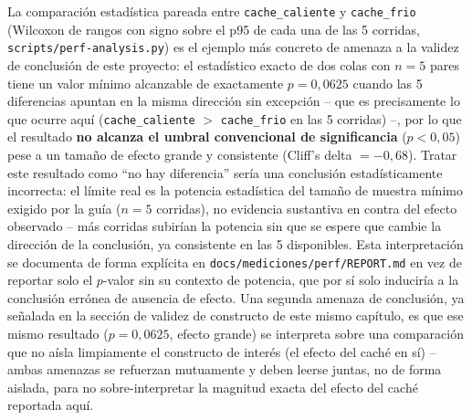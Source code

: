 La comparación estadística pareada entre \texttt{cache\_caliente} y
\texttt{cache\_frio} (Wilcoxon de rangos con signo sobre el p95 de cada
una de las 5 corridas, \texttt{scripts/perf-analysis.py}) es el ejemplo
más concreto de amenaza a la validez de conclusión de este proyecto: el
estadístico exacto de dos colas con $n=5$ pares tiene un valor mínimo
alcanzable de exactamente $p=0{,}0625$ cuando las 5 diferencias apuntan
en la misma dirección sin excepción -- que es precisamente lo que
ocurre aquí (\texttt{cache\_caliente} $>$ \texttt{cache\_frio} en las 5
corridas) --, por lo que el resultado \textbf{no alcanza el umbral
convencional de significancia} ($p<0{,}05$) pese a un tamaño de efecto
grande y consistente (Cliff's delta $=-0{,}68$). Tratar este resultado
como ``no hay diferencia'' sería una conclusión estadísticamente
incorrecta: el límite real es la potencia estadística del tamaño de
muestra mínimo exigido por la guía ($n=5$ corridas), no evidencia
sustantiva en contra del efecto observado -- más corridas subirían la
potencia sin que se espere que cambie la dirección de la conclusión, ya
consistente en las 5 disponibles. Esta interpretación se documenta de
forma explícita en \texttt{docs/mediciones/perf/REPORT.md} en vez de
reportar solo el $p$-valor sin su contexto de potencia, que por sí solo
induciría a la conclusión errónea de ausencia de efecto. Una segunda
amenaza de conclusión, ya señalada en la sección de validez de
constructo de este mismo capítulo, es que ese mismo resultado
($p=0{,}0625$, efecto grande) se interpreta sobre una comparación que no
aísla limpiamente el constructo de interés (el efecto del caché en sí) --
ambas amenazas se refuerzan mutuamente y deben leerse juntas, no de
forma aislada, para no sobre-interpretar la magnitud exacta del efecto
del caché reportada aquí.
